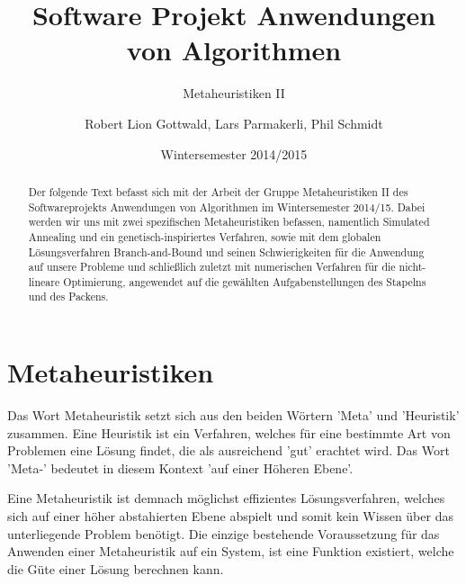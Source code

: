 \documentclass[runningheads,a4paper]{llncs}
\begin{document}
\mainmatter

\title{Software Projekt Anwendungen von Algorithmen}
\subtitle{Metaheuristiken II}
\date{Wintersemester 2014/2015}

\author{Robert Lion Gottwald, Lars Parmakerli, Phil Schmidt}

\maketitle
\begin{abstract}
Der folgende Text befasst sich mit der Arbeit der Gruppe Metaheuristiken II des Softwareprojekts Anwendungen von Algorithmen im Wintersemester 2014/15. Dabei werden wir uns mit zwei  spezifischen Metaheuristiken befassen, namentlich Simulated Annealing und ein genetisch-inspiriertes Verfahren, sowie mit dem globalen Lösungsverfahren Branch-and-Bound und seinen Schwierigkeiten für die Anwendung auf unsere Probleme und schließlich zuletzt mit numerischen Verfahren für die nicht-lineare Optimierung, angewendet auf die gewählten Aufgabenstellungen des Stapelns und des Packens.

\end{abstract}

\section{Metaheuristiken}

Das Wort Metaheuristik setzt sich aus den beiden Wörtern 'Meta' und 'Heuristik'  zusammen.
Eine Heuristik ist ein Verfahren, welches für eine bestimmte Art von Problemen eine Lösung findet, die als ausreichend 'gut' erachtet wird. 
Das Wort 'Meta-' bedeutet in diesem Kontext 'auf einer Höheren Ebene'.

Eine Metaheuristik ist demnach möglichst effizientes Lösungsverfahren, welches sich auf einer höher abstahierten Ebene abspielt und somit kein Wissen über das unterliegende Problem benötigt. Die einzige bestehende Voraussetzung für das Anwenden einer Metaheuristik auf ein System, ist eine Funktion existiert, welche die Güte einer Lösung berechnen kann.
\end{document}
